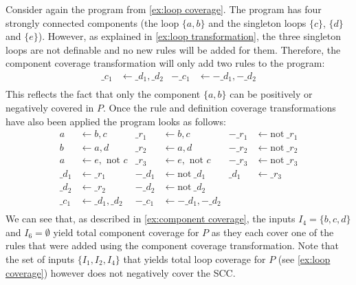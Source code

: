 \begin{example}
\label{ex:component transformation}
    Consider again the program from \cref{ex:loop coverage}. The program has four strongly connected components (the loop \(\{a, b\}\) and the singleton loops $\{c\}$, $\{d\}$ and $\{e\}$). However, as explained in \cref{ex:loop transformation}, the three singleton loops are not definable and no new rules will be added for them. Therefore, the component coverage transformation will only add two rules to the program:
    \begin{align*}
        \_c_1 &\leftarrow \_d_1, \_d_2  &  -\_c_1 &\leftarrow -\_d_1, -\_d_2 \\
    \end{align*}
    This reflects the fact that only the component \(\{a, b\}\) can be positively or negatively covered in $P$. Once the rule and definition coverage transformations have also been applied the program looks as follows:
    \begin{align*}
        a     &\leftarrow b, c               &  \_r_1   &\leftarrow b, c                 & -\_r_1 &\leftarrow \text{not}\ \_r_1  \\  
        b     &\leftarrow a, d               &  \_r_2   &\leftarrow a, d                 & -\_r_2 &\leftarrow \text{not}\ \_r_2  \\  
        a     &\leftarrow e, \text{ not } c  &  \_r_3   &\leftarrow e, \text{ not } c    & -\_r_3 &\leftarrow \text{not}\ \_r_3  \\
        \_d_1 &\leftarrow \_r_1              &   -\_d_1 &\leftarrow \text{not}\ \_d_1  &  \_d_1 &\leftarrow \_r_3 \\
        \_d_2 &\leftarrow \_r_2              &   -\_d_2 &\leftarrow \text{not}\ \_d_2 \\
        \_c_1 &\leftarrow \_d_1, \_d_2       & -\_c_1   &\leftarrow -\_d_1, -\_d_2 \\
    \end{align*}
    We can see that, as described in \cref{ex:component coverage}, the inputs \(I_4 = \{b, c, d\}\) and \(I_6 = \emptyset\) yield total component coverage for $P$ as they each cover one of the rules that were added using the component coverage transformation. Note that the set of inputs \(\{I_1, I_2, I_4\}\) that yields total loop coverage for $P$ (see \cref{ex:loop coverage}) however does not negatively cover the SCC.
\end{example}


